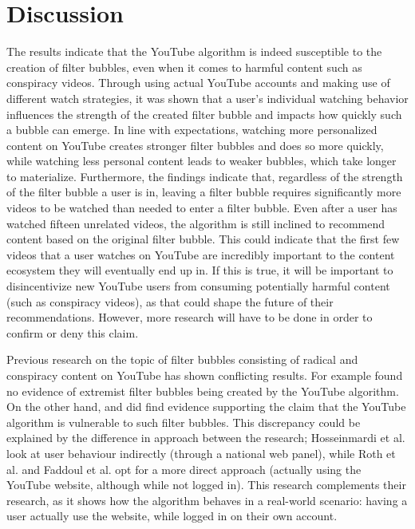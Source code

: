 \documentclass[../main.tex]{subfiles}
\begin{document}
\section{Discussion}
The results indicate that the YouTube algorithm is indeed susceptible to the creation of filter bubbles, even when it
comes to harmful content such as conspiracy videos. Through using actual YouTube accounts and making use of different
watch strategies, it was shown that a user's individual watching behavior influences the strength of the created filter
bubble and impacts how quickly such a bubble can emerge. In line with expectations, watching more personalized content
on YouTube creates stronger filter bubbles and does so more quickly, while watching less personal content leads to
weaker bubbles, which take longer to materialize. Furthermore, the findings indicate that, regardless of the strength of
the filter bubble a user is in, leaving a filter bubble requires significantly more videos to be watched than needed to
enter a filter bubble. Even after a user has watched fifteen unrelated videos, the algorithm is still inclined to
recommend content based on the original filter bubble. This could indicate that the first few videos that a user
watches on YouTube are incredibly important to the content ecosystem they will eventually end up in. If this is true, it
will be important to disincentivize new YouTube users from consuming potentially harmful content (such as conspiracy
videos), as that could shape the future of their recommendations. However, more research will have to be done in order
to confirm or deny this claim. 

Previous research on the topic of filter bubbles consisting of radical and conspiracy content on YouTube has shown 
conflicting results. For example \citet{hosseinmardi2020evaluating} found no evidence of extremist filter bubbles being 
created by the YouTube algorithm. On the other hand, \citet{roth2020tubes} and \citet{Faddoul2020ALA} did find evidence 
supporting the claim that the YouTube algorithm is vulnerable to such filter bubbles. This discrepancy could be
explained by the difference in approach between the research; Hosseinmardi et al. look at user behaviour indirectly
(through a national web panel), while Roth et al. and Faddoul et al. opt for a more direct approach (actually using the
YouTube website, although while not logged in). This research complements their research, as it shows how the algorithm behaves in a real-world scenario: having a user actually use the website, while logged in on their own account. 
\end{document}
